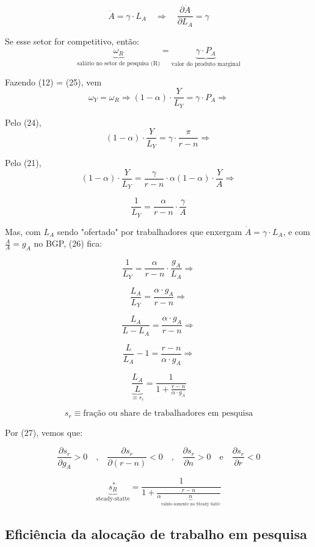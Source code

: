 \documentclass[a4paper,12pt]{article}[abntex2]
\begin{document}
\[
\dot{A} = \gamma \cdot L_A \quad \Rightarrow \quad \frac{\partial \dot{A}}{\partial L_A} = \gamma
\]

\begin{center}
\end{center}

Se esse setor for competitivo, então:
\[
\underbrace{\omega_R}_\text{salário no setor de pesquisa (R)} = \underbrace{\gamma \cdot P_A}_\text{valor do produto marginal} \tag{25}
\]

Fazendo (12) = (25), vem
\[
\omega_Y = \omega_R \Rightarrow (1 - \alpha) \cdot \frac{Y}{L_Y} = \gamma \cdot P_A
\Rightarrow
\]

Pelo (24),
\[
(1 - \alpha) \cdot \frac{Y}{L_Y} = \gamma \cdot \frac{\pi}{r - n}
\Rightarrow
\]

Pelo (21),
\[
(1 - \alpha) \cdot \frac{Y}{L_Y} = \frac{\gamma}{r - n} \cdot \alpha (1 - \alpha) \cdot \frac{Y}{A}
\Rightarrow
\]

\[
\frac{1}{L_Y} = \frac{\alpha}{r - n} \cdot \frac{\gamma}{A} \tag{26}
\]

Mas, com $L_A$ sendo "ofertado" por trabalhadores que enxergam $\dot{A} = \gamma \cdot L_A$, e com $\frac{\dot{A}}{A} = g_A$ no BGP, (26) fica:

\[
\frac{1}{L_Y} = \frac{\alpha}{r - n} \cdot \frac{g_A}{L_A}
\Rightarrow
\]

\[
\frac{L_A}{L_Y} = \frac{\alpha \cdot g_A}{r - n}
\Rightarrow
\]

\[
\frac{L_A}{L - L_A} = \frac{\alpha \cdot g_A}{r - n}
\Rightarrow
\]

\[
\frac{L}{L_A} - 1 = \frac{r - n}{\alpha \cdot g_A}
\Rightarrow
\]

\[
\underbrace{\frac{L_A}{L}}_{\equiv s_r} = \frac{1}{1 + \frac{r - n}{\alpha \cdot g_A}} \tag{27}
\]

\[
s_r \equiv \text{fração ou share de trabalhadores em pesquisa}
\]

Por (27), vemos que:

\[
\frac{\partial s_r}{\partial g_A} > 0 \quad \text{,} \quad \frac{\partial s_r}{\partial (r - n)} < 0 \quad \text{,} \quad \frac{\partial s_r}{\partial n} > 0 \quad \text{e} \quad \frac{\partial s_r}{\partial r} < 0 
\]

\[
\underbrace{s_R^*}_\text{steady-statte}=\frac{1}{1+\frac{r-n}{\alpha \underbrace{n}_\text{válido somente no Steady Satte}}} \tag{27'}
\]

\subsection{\textbf{Eficiência da alocação de trabalho em pesquisa}}
\end{document}
